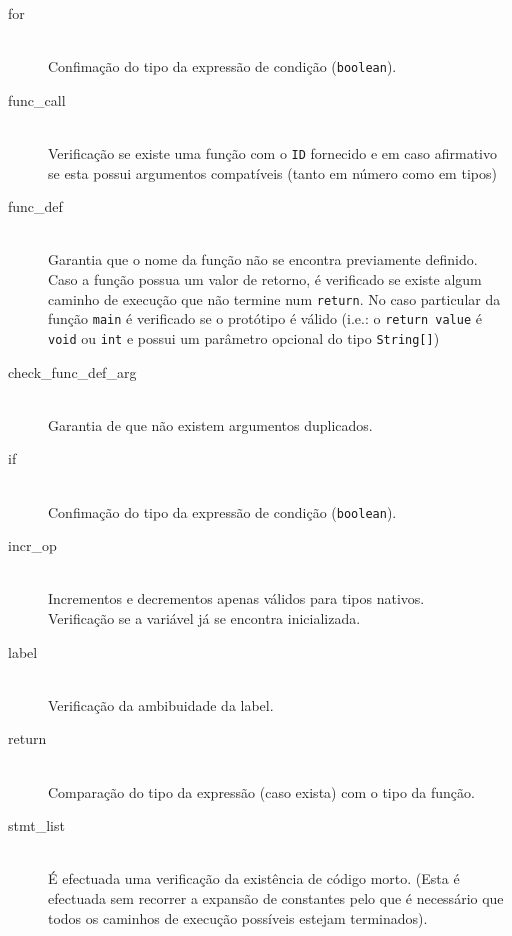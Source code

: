 \documentclass[a4paper]{article}
\begin{document}
\begin{description}
	\item [for] \hfill \\
		Confimação do tipo da expressão de condição (\texttt{boolean}).

	\item [func\_call] \hfill \\
		Verificação se existe uma função com o \texttt{ID} fornecido e em caso afirmativo se esta possui argumentos compatíveis
		(tanto em número como em tipos)
		
	\item [func\_def] \hfill \\
		Garantia que o nome da função não se encontra previamente definido. \\
		Caso a função possua um valor de retorno, é verificado se existe algum caminho de execução que não termine num \texttt{return}.
		No caso particular da função \texttt{main} é verificado se o protótipo é válido
		(i.e.: o \texttt{return value} é \texttt{void} ou \texttt{int} e possui um parâmetro opcional do tipo \texttt{String[]})
		
	\item [check\_func\_def\_arg] \hfill \\
		Garantia de que não existem argumentos duplicados.

	\item [if] \hfill \\
		Confimação do tipo da expressão de condição (\texttt{boolean}).

	\item [incr\_op] \hfill \\
		Incrementos e decrementos apenas válidos para tipos nativos. \\
		Verificação se a variável já se encontra inicializada.

	\item [label] \hfill \\
		Verificação da ambibuidade da label.

	\item [return] \hfill \\
		Comparação do tipo da expressão (caso exista) com o tipo da função.

	\item [stmt\_list] \hfill \\
		É efectuada uma verificação da existência de código morto. (Esta é efectuada sem recorrer a expansão
		de constantes pelo que é necessário que todos os caminhos de execução possíveis estejam terminados).


\end{description}
\end{document}
